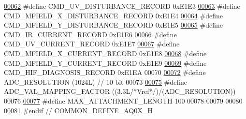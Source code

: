 \begin{DoxyCode}
\hypertarget{a00086_source_l00062}{}\hyperlink{a00086_ae45bb46748497c6a117beb1e93072d83}{00062} \textcolor{preprocessor}{#define CMD\_UV\_DISTURBANCE\_RECORD                               0xE1E3}
\hypertarget{a00086_source_l00063}{}\hyperlink{a00086_ab84aea346a3f75b58f8bda67b8ae9be0}{00063} \textcolor{preprocessor}{#define CMD\_MFIELD\_X\_DISTURBANCE\_RECORD                         0xE1E4}
\hypertarget{a00086_source_l00064}{}\hyperlink{a00086_af77e9c0ad32b3cc50d61992d4b64a831}{00064} \textcolor{preprocessor}{#define CMD\_MFIELD\_Y\_DISTURBANCE\_RECORD                         0xE1E5}
\hypertarget{a00086_source_l00065}{}\hyperlink{a00086_a4dcce4fd3ff29eb6782f3228901f99cf}{00065} \textcolor{preprocessor}{#define CMD\_IR\_CURRENT\_RECORD                                   0xE1E6}
\hypertarget{a00086_source_l00066}{}\hyperlink{a00086_ab0e0364ddc2d95d1e5b51a3e3ff50918}{00066} \textcolor{preprocessor}{#define CMD\_UV\_CURRENT\_RECORD                                   0xE1E7}
\hypertarget{a00086_source_l00067}{}\hyperlink{a00086_ab796345ffdbc6a240b67b56583bb77c6}{00067} \textcolor{preprocessor}{#define CMD\_MFIELD\_X\_CURRENT\_RECORD                             0xE1E8}
\hypertarget{a00086_source_l00068}{}\hyperlink{a00086_a8ddac7f7a2a90f2d8535af02e338b1bf}{00068} \textcolor{preprocessor}{#define CMD\_MFIELD\_Y\_CURRENT\_RECORD                             0xE1E9}
\hypertarget{a00086_source_l00069}{}\hyperlink{a00086_a185ed5442d69c7c8abba13323a8e8187}{00069} \textcolor{preprocessor}{#define CMD\_HIF\_DIAGNOSIS\_RECORD                                0xE1EA}
00070 
\hypertarget{a00086_source_l00072}{}\hyperlink{a00086_a00978ca9e8220475258dcbbbb7d29129}{00072} \textcolor{preprocessor}{#define ADC\_RESOLUTION                                          (1024L) // 10 bit}
00073 
\hypertarget{a00086_source_l00075}{}\hyperlink{a00086_ada92d3eeeec0cbeee41e76a52d145792}{00075} \textcolor{preprocessor}{#define ADC\_VAL\_MAPPING\_FACTOR                                  ((3.3L}\textcolor{comment}{/*Vref*/}\textcolor{preprocessor}{)/(ADC\_RESOLUTION))}
00076 
\hypertarget{a00086_source_l00077}{}\hyperlink{a00086_aa8abe3a822c64813f7aaba3ca7e3db9c}{00077} \textcolor{preprocessor}{#define MAX\_ATTACHMENT\_LENGTH                                   100}
00078 
00079 
00080 
00081 \textcolor{preprocessor}{#endif // COMMON\_DEFINE\_AQ0X\_H}
\end{DoxyCode}
